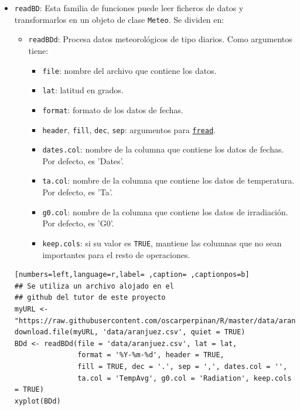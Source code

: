 \begin{itemize}
\item \texttt{readBD}: Esta familia de funciones puede leer ficheros de datos y transformarlos en un objeto de clase \texttt{Meteo}. Se dividen en:
\begin{itemize}
\item \texttt{readBDd}: Procesa datos meteorológicos de tipo diarios.
Como argumentos tiene:
\begin{itemize}
\item \texttt{file}: nombre del archivo que contiene los datos.
\item \texttt{lat}: latitud en grados.
\item \texttt{format}: formato de los datos de fechas.
\item \texttt{header}, \texttt{fill}, \texttt{dec}, \texttt{sep}: argumentos para \href{https://search.r-project.org/CRAN/refmans/data.table/html/fread.html}{\texttt{fread}}.
\item \texttt{dates.col}: nombre de la columna que contiene los datos de fechas. Por defecto, es 'Dates'.
\item \texttt{ta.col}: nombre de la columna que contiene los datos de temperatura. Por defecto, es 'Ta'.
\item \texttt{g0.col}: nombre de la columna que contiene los datos de irradiación. Por defecto, es 'G0'.
\item \texttt{keep.cols}: si su valor es \texttt{TRUE}, mantiene las columnas que no sean importantes para el resto de operaciones.
\end{itemize}
\end{itemize}
\begin{lstlisting}[numbers=left,language=r,label= ,caption= ,captionpos=b]
## Se utiliza un archivo alojado en el
## github del tutor de este proyecto 
myURL <-"https://raw.githubusercontent.com/oscarperpinan/R/master/data/aranjuez.csv"
download.file(myURL, 'data/aranjuez.csv', quiet = TRUE)
BDd <- readBDd(file = 'data/aranjuez.csv', lat = lat,
               format = '%Y-%m-%d', header = TRUE,
               fill = TRUE, dec = '.', sep = ',', dates.col = '',
               ta.col = 'TempAvg', g0.col = 'Radiation', keep.cols = TRUE)
xyplot(BDd)
\end{lstlisting}


\end{itemize}
